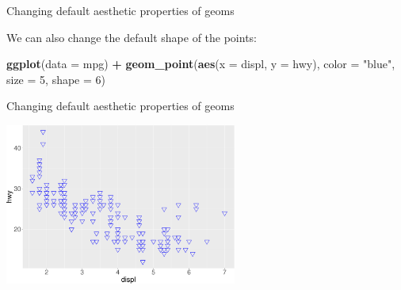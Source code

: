 \documentclass[ignorenonframetext,]{beamer}
\newenvironment{Shaded}{\begin{snugshade}}{\end{snugshade}}
\newcommand{\DataTypeTok}[1]{\textcolor[rgb]{0.13,0.29,0.53}{#1}}
\newcommand{\DecValTok}[1]{\textcolor[rgb]{0.00,0.00,0.81}{#1}}
\newcommand{\KeywordTok}[1]{\textcolor[rgb]{0.13,0.29,0.53}{\textbf{#1}}}
\newcommand{\NormalTok}[1]{#1}
\newcommand{\OperatorTok}[1]{\textcolor[rgb]{0.81,0.36,0.00}{\textbf{#1}}}
\newcommand{\StringTok}[1]{\textcolor[rgb]{0.31,0.60,0.02}{#1}}
\begin{document}
\begin{frame}[fragile]{Changing default aesthetic properties of geoms}
\protect\hypertarget{changing-default-aesthetic-properties-of-geoms-6}{}

We can also change the default shape of the points:

\begin{Shaded}
\begin{Highlighting}[]
\KeywordTok{ggplot}\NormalTok{(}\DataTypeTok{data =}\NormalTok{ mpg) }\OperatorTok{+}\StringTok{ }
\StringTok{  }\KeywordTok{geom_point}\NormalTok{(}\KeywordTok{aes}\NormalTok{(}\DataTypeTok{x =}\NormalTok{ displ, }\DataTypeTok{y =}\NormalTok{ hwy), }
    \DataTypeTok{color =} \StringTok{"blue"}\NormalTok{,}
    \DataTypeTok{size =} \DecValTok{5}\NormalTok{,}
    \DataTypeTok{shape =} \DecValTok{6}\NormalTok{)}
\end{Highlighting}
\end{Shaded}

\end{frame}

\begin{frame}{Changing default aesthetic properties of geoms}
\protect\hypertarget{changing-default-aesthetic-properties-of-geoms-7}{}

\begin{center}\includegraphics[height=200px]{data-visualization_files/figure-beamer/unnamed-chunk-43-1} \end{center}

\end{frame}
\end{document}
